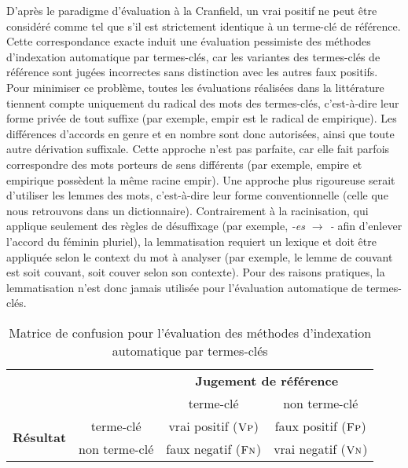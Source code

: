     D'après le paradigme d'évaluation \og{}à la Cranfield\fg{}, un
    vrai positif ne peut être considéré comme tel que s'il est strictement
    identique à un terme-clé de référence. Cette correspondance \og{}exacte\fg{}
    induit une évaluation pessimiste des méthodes d'indexation automatique par
    termes-clés, car les variantes des termes-clés de référence sont jugées
    incorrectes sans distinction avec les autres faux positifs. Pour minimiser
    ce problème, toutes les évaluations réalisées dans la littérature tiennent
    compte uniquement du radical des mots des termes-clés, c'est-à-dire leur
    forme privée de tout suffixe (par exemple, \og{}empir\fg{} est le radical de
    \og{}empirique\fg{}). Les différences d'accords en genre et en
    nombre sont donc autorisées, ainsi que toute autre dérivation suffixale.
    Cette approche n'est pas parfaite, car elle fait parfois correspondre des
    mots porteurs de sens différents (par exemple, \og{}empire\fg{} et
    \og{}empirique\fg{} possèdent la même racine \og{}empir\fg{}). Une approche
    plus rigoureuse serait d'utiliser les lemmes des mots, c'est-à-dire leur
    forme conventionnelle (celle que nous retrouvons dans  un dictionnaire).
    Contrairement à la racinisation, qui applique seulement des règles de
    désuffixage (par exemple, \textit{-es $\rightarrow$ -} afin d'enlever l'accord du
    féminin pluriel), la lemmatisation requiert un lexique et doit être
    appliquée selon le context du mot à analyser (par exemple, le lemme de
    \og{}couvant\fg{} est soit \og{}couvant\fg{}, soit \og{}couver\fg{} selon
    son contexte). Pour des raisons pratiques, la lemmatisation n'est donc jamais
    utilisée pour l'évaluation automatique de termes-clés.
    \begin{table}
      \begin{center}
        \begin{tabular}{cc|cc}
          \toprule
          \multicolumn{2}{c|}{} & \multicolumn{2}{c}{\textbf{Jugement de référence}}\\
          \multicolumn{2}{c|}{} & \og{}terme-clé\fg{} & \og{}non terme-clé\fg{}\\
          \hline
          \multirow{2}{*}{\textbf{Résultat}} & \og{}terme-clé\fg{} & vrai positif ($\textsc{Vp}$) & faux positif ($\textsc{Fp}$)\\
          & \og{}non terme-clé\fg{} & faux negatif ($\textsc{Fn}$) & vrai negatif ($\textsc{Vn}$)\\
          \bottomrule
        \end{tabular}
        \caption{Matrice de confusion pour l'évaluation des méthodes
                 d'indexation automatique par termes-clés
                \label{tab:confusion_matrix}}
      \end{center}
    \end{table}

